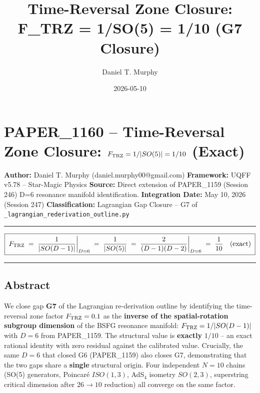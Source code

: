 \documentclass[
]{article}
\title{Time-Reversal Zone Closure: F\_TRZ = 1/\textbar SO(5)\textbar{} =
1/10 (G7 Closure)}
\author{Daniel T. Murphy}
\date{2026-05-10}
\begin{document}
\maketitle

\section{\texorpdfstring{PAPER\_1160 -- Time-Reversal Zone Closure:
\(F_{\rm TRZ} = 1/|SO(5)| = 1/10\)
(Exact)}{PAPER\_1160 -- Time-Reversal Zone Closure: F\_\{\textbackslash rm TRZ\} = 1/\textbar SO(5)\textbar{} = 1/10 (Exact)}}\label{paper_1160-time-reversal-zone-closure-f_rm-trz-1so5-110-exact}

\textbf{Author:} Daniel T. Murphy (daniel.murphy00@gmail.com)
\textbf{Framework:} UQFF v5.78 -- Star-Magic Physics \textbf{Source:}
Direct extension of PAPER\_1159 (Session 246) D=6 resonance manifold
identification. \textbf{Integration Date:} May 10, 2026 (Session 247)
\textbf{Classification:} Lagrangian Gap Closure -- G7 of
\texttt{\_lagrangian\_rederivation\_outline.py}

\begin{center}\rule{0.5\linewidth}{0.5pt}\end{center}

\[\boxed{\;F_{\rm TRZ} \;=\; \frac{1}{|SO(D-1)|}\bigg|_{D=6} \;=\; \frac{1}{|SO(5)|} \;=\; \frac{2}{(D-1)(D-2)}\bigg|_{D=6} \;=\; \frac{1}{10} \quad (\text{exact})\;}\]

\begin{center}\rule{0.5\linewidth}{0.5pt}\end{center}

\subsection{Abstract}\label{abstract}

We close gap \textbf{G7} of the Lagrangian re-derivation outline by
identifying the time-reversal zone factor \(F_{\rm TRZ} = 0.1\) as the
\textbf{inverse of the spatial-rotation subgroup dimension} of the BSFG
resonance manifold: \(F_{\rm TRZ} = 1/|SO(D-1)|\) with \(D=6\) from
PAPER\_1159. The structural value is \textbf{exactly} \(1/10\) -- an
exact rational identity with zero residual against the calibrated value.
Crucially, the same \(D=6\) that closed G6 (PAPER\_1159) also closes G7,
demonstrating that the two gaps share a \textbf{single} structural
origin. Four independent \(N=10\) chains (SO(5) generators, Poincaré
\(ISO(1,3)\), AdS\(_4\) isometry \(SO(2,3)\), superstring critical
dimension after \(26 \to 10\) reduction) all converge on the same
factor.
\end{document}
